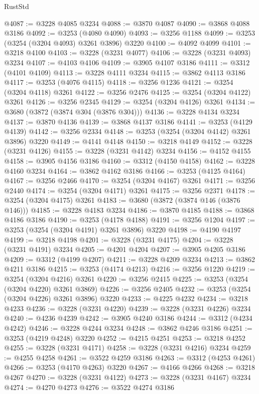 \begin{lexlean}{RustStd}
\begin{coremodule}
@4087 := @3228 @4085 @3234
@4088 := @3870 @4087
@4090 := @3868 @4088 @3186
@4092 := @3253 (@4080 @4090)
@4093 := @3256 @1188
@4099 := @3253 (@3254 (@3204 @4093) @3261 @3896) @3220
@4100 := @4092 @4099
@4101 := @3218 @4100
@4103 := @3228 (@3231 @4077)
@4106 := @3228 (@3231 @4093) @3234
@4107 := @4103 @4106
@4109 := @3905 @4107 @3186
@4111 := @3312 (@4101 @4109)
@4113 := @3228 @4111 @3234
@4115 := @3862 @4113 @3186
@4117 := @3253 (@4076 @4115)
@4118 := @3256 @1236
@4121 := @3254 (@3204 @4118) @3261
@4122 := @3256 @2476
@4125 := @3254 (@3204 @4122) @3261
@4126 := @3256 @2345
@4129 := @3254 (@3204 @4126) @3261
@4134 := @3680 (@3872 (@3874 @304 (@3876 @304)))
@4136 := @3228 @4134 @3234
@4137 := @3870 @4136
@4139 := @3868 @4137 @3186
@4141 := @3253 (@4129 @4139)
@4142 := @3256 @2334
@4148 := @3253 (@3254 (@3204 @4142) @3261 @3896) @3220
@4149 := @4141 @4148
@4150 := @3218 @4149
@4152 := @3228 (@3231 @4126)
@4155 := @3228 (@3231 @4142) @3234
@4156 := @4152 @4155
@4158 := @3905 @4156 @3186
@4160 := @3312 (@4150 @4158)
@4162 := @3228 @4160 @3234
@4164 := @3862 @4162 @3186
@4166 := @3253 (@4125 @4164)
@4167 := @3256 @2466
@4170 := @3254 (@3204 @4167) @3261
@4171 := @3256 @2440
@4174 := @3254 (@3204 @4171) @3261
@4175 := @3256 @2371
@4178 := @3254 (@3204 @4175) @3261
@4183 := @3680 (@3872 (@3874 @146 (@3876 @146)))
@4185 := @3228 @4183 @3234
@4186 := @3870 @4185
@4188 := @3868 @4186 @3186
@4190 := @3253 (@4178 @4188)
@4191 := @3256 @1204
@4197 := @3253 (@3254 (@3204 @4191) @3261 @3896) @3220
@4198 := @4190 @4197
@4199 := @3218 @4198
@4201 := @3228 (@3231 @4175)
@4204 := @3228 (@3231 @4191) @3234
@4205 := @4201 @4204
@4207 := @3905 @4205 @3186
@4209 := @3312 (@4199 @4207)
@4211 := @3228 @4209 @3234
@4213 := @3862 @4211 @3186
@4215 := @3253 (@4174 @4213)
@4216 := @3256 @1220
@4219 := @3254 (@3204 @4216) @3261
@4220 := @3256 @2415
@4225 := @3253 (@3254 (@3204 @4220) @3261 @3869)
@4226 := @3256 @2405
@4232 := @3253 (@3254 (@3204 @4226) @3261 @3896) @3220
@4233 := @4225 @4232
@4234 := @3218 @4233
@4236 := @3228 (@3231 @4220)
@4239 := @3228 (@3231 @4226) @3234
@4240 := @4236 @4239
@4242 := @3905 @4240 @3186
@4244 := @3312 (@4234 @4242)
@4246 := @3228 @4244 @3234
@4248 := @3862 @4246 @3186
@4251 := @3253 (@4219 @4248) @3220
@4252 := @4215 @4251
@4253 := @3218 @4252
@4255 := @3228 (@3231 @4171)
@4258 := @3228 (@3231 @4216) @3234
@4259 := @4255 @4258
@4261 := @3522 @4259 @3186
@4263 := @3312 (@4253 @4261)
@4266 := @3253 (@4170 @4263) @3220
@4267 := @4166 @4266
@4268 := @3218 @4267
@4270 := @3228 (@3231 @4122)
@4273 := @3228 (@3231 @4167) @3234
@4274 := @4270 @4273
@4276 := @3522 @4274 @3186

\end{coremodule}
\end{lexlean}
